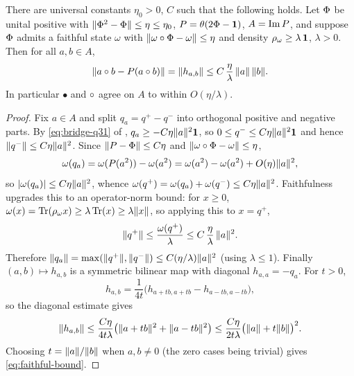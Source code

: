 \begin{theorem}
\label{thm:faithful-approx}
There are universal constants $\eta_0>0$, $C$ such that the following holds. Let
$\Phi$ be unital positive with $\lVert \Phi^2-\Phi \rVert\le\eta\le\eta_0$,
$P=\theta(2\Phi-\mathbf{1})$, $A=\operatorname{Im} P$, and suppose $\Phi$ admits a faithful
state $\omega$ with $\lVert \omega\circ\Phi-\omega \rVert\le\eta$ and density
$\rho_\omega\ge\lambda\,\mathbf{1}$, $\lambda>0$. Then for all $a,b\in A$,
\begin{equation}\label{eq:faithful-bound}
  \lVert a\circ b-P(a\circ b) \rVert=\lVert h_{a,b} \rVert\le C\,\frac{\eta}{\lambda}\,
    \lVert a \rVert\,\lVert b \rVert.
\end{equation}
In particular $\bullet$ and $\circ$ agree on $A$ to within $O(\eta/\lambda)$.
\end{theorem}

\begin{proof}
Fix $a\in A$ and split $q_a=q^+-q^-$ into orthogonal positive and negative
parts. By \eqref{eq:bridge-q31} of ,
$q_a\ge-C\eta\lVert a \rVert^2\mathbf{1}$, so $0\le q^-\le C\eta\lVert a \rVert^2\mathbf{1}$ and hence
$\lVert q^- \rVert\le C\eta\lVert a \rVert^2$. Since $\lVert P-\Phi \rVert\le C\eta$ and
$\lVert \omega\circ\Phi-\omega \rVert\le\eta$,
\[
  \omega(q_a)=\omega(P(a^2))-\omega(a^2)
   =\omega(a^2)-\omega(a^2)+O(\eta)\lVert a \rVert^2,
\]
so $\lvert\omega(q_a)\rvert\le C\eta\lVert a \rVert^2$, whence
$\omega(q^+)=\omega(q_a)+\omega(q^-)\le C\eta\lVert a \rVert^2$. Faithfulness upgrades
this to an operator-norm bound: for $x\ge0$,
$\omega(x)=\operatorname{Tr}(\rho_\omega x)\ge\lambda\operatorname{Tr}(x)\ge\lambda\lVert x \rVert$, so applying
this to $x=q^+$,
\[
  \lVert q^+ \rVert\le\frac{\omega(q^+)}{\lambda}\le C\,\frac{\eta}{\lambda}\,\lVert a \rVert^2 .
\]
Therefore $\lVert q_a \rVert=\max(\lVert q^+ \rVert,\lVert q^- \rVert)\le C(\eta/\lambda)\lVert a \rVert^2$
(using $\lambda\le1$). Finally $(a,b)\mapsto h_{a,b}$ is a symmetric bilinear
map with diagonal $h_{a,a}=-q_a$. For $t>0$,
\[
  h_{a,b}
   =\frac{1}{4t}\big(h_{a+tb,a+tb}-h_{a-tb,a-tb}\big),
\]
so the diagonal estimate gives
\[
	  \lVert h_{a,b} \rVert
	  \le \frac{C\eta}{4t\lambda}
	       \big(\lVert a+tb \rVert^2+\lVert a-tb \rVert^2\big)
	  \le \frac{C\eta}{2t\lambda}
	       \big(\lVert a \rVert+t\lVert b \rVert\big)^2.
	\]
	Choosing $t=\lVert a \rVert/\lVert b \rVert$ when $a,b\ne0$ (the zero cases being trivial)
	gives \eqref{eq:faithful-bound}.
\end{proof}

